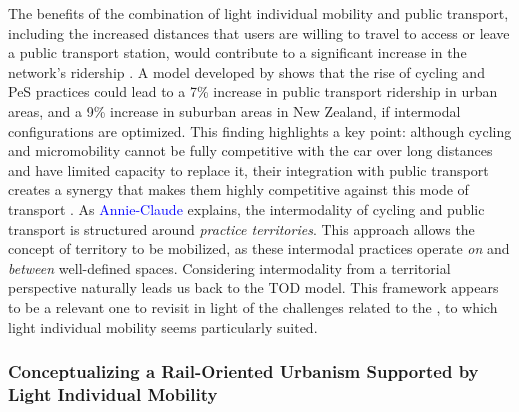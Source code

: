 \begin{refsegment}
The benefits of the combination of light individual mobility and public transport, including the increased distances that users are willing to travel to access or leave a public transport station, would contribute to a significant increase in the network's ridership \textcolor{blue}{\autocite[]{wang_approximating_2016}}. A model developed by \textcolor{blue}{\textcite[69]{ensor_mode_2021}} shows that the rise of cycling and \acrshort{PeS} practices could lead to a 7\% increase in public transport ridership in urban areas, and a 9\% increase in suburban areas in New Zealand, if intermodal configurations are optimized. This finding highlights a key point: although cycling and micromobility cannot be fully competitive with the car over long distances and have limited capacity to replace it, their integration with public transport creates a synergy that makes them highly competitive against this mode of transport \textcolor{blue}{\autocite[43]{corporate_partnership_board_good_2020}}. As \textcolor{blue}{Annie-Claude} \textcolor{blue}{\textcite[262]{sebban_complementarite_2003}} explains, the intermodality of cycling and public transport is structured around \textsl{practice territories}. This approach allows the concept of territory to be mobilized, as these intermodal practices operate \textsl{on} and \textsl{between} well-defined spaces. Considering intermodality from a territorial perspective naturally leads us back to the \acrshort{TOD} model. This framework appears to be a relevant one to revisit in light of the challenges related to the , to which light individual mobility seems particularly suited.%

\subsubsection*{Conceptualizing a Rail-Oriented Urbanism Supported by Light Individual Mobility
    \label{chap1:btod-m-tod}
    }


\end{refsegment}
